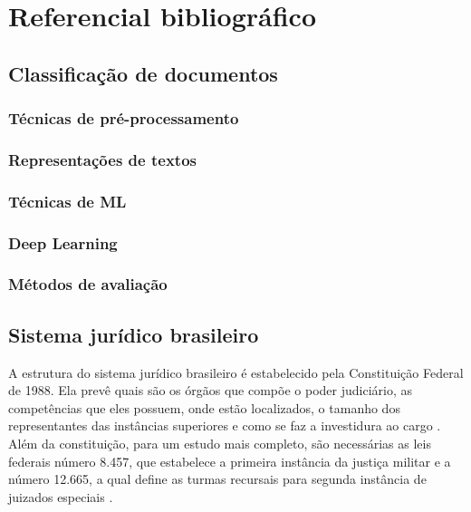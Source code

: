 \chapter[Referêncial bibliográfico]{Referencial bibliográfico}

\section{Classificação de documentos}
\subsection{Técnicas de pré-processamento}
\subsection{Representações de textos}
\subsection{Técnicas de ML}
\subsection{Deep Learning}
\subsection{Métodos de avaliação}

\section{Sistema jurídico brasileiro}

A estrutura do sistema jurídico brasileiro é estabelecido pela Constituição Federal de 1988. Ela prevê quais são os órgãos que compõe o poder judiciário, as competências que eles possuem, onde estão localizados, o tamanho dos representantes das instâncias superiores e como se faz a investidura ao cargo \cite{BRASIL1988}. Além da constituição, para um estudo mais completo, são necessárias as leis federais número 8.457, que estabelece a primeira instância da justiça militar \cite{BRASIL1992} e a número 12.665, a qual define as turmas recursais para segunda instância de juizados especiais \cite{BRASIL2012}.

